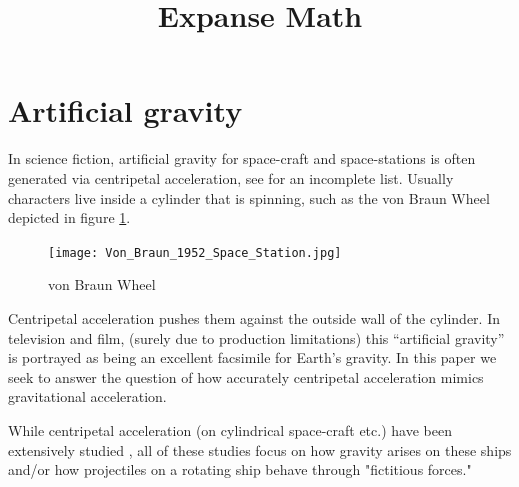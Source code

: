 \documentclass{amsart}
\title{Expanse Math}
\theoremstyle{definition}
\begin{document}
\maketitle

\section{Artificial gravity}

In science fiction, artificial gravity for space-craft and
space-stations is often generated via centripetal acceleration, see
\cite{2001,2010,missiontomars,themartian,expanse,babylon5,europareport,ringworld?,rama,intersetller,etc}
for an incomplete list. Usually characters live inside a cylinder that
is spinning, such as the von Braun Wheel depicted in figure
\ref{fig:Braun Wheel}.

\begin{figure}[h]
  \centering
  \texttt{[image: Von\_Braun\_1952\_Space\_Station.jpg]}
  \caption{von Braun Wheel}
  \label{fig:Braun Wheel}
\end{figure}

Centripetal acceleration pushes them against the outside wall of the
cylinder. In television and film, (surely due to production
limitations) this ``artificial gravity'' is portrayed as being an
excellent facsimile for Earth's gravity. In this paper we seek to
answer the question of how accurately centripetal acceleration mimics
gravitational acceleration.


While centripetal acceleration (on cylindrical space-craft etc.) have
been extensively studied \cite{papers,anotherpaper}, all of these
studies focus on how gravity arises on these ships and/or how projectiles on 
a rotating ship behave through "fictitious forces."
\end{document}

